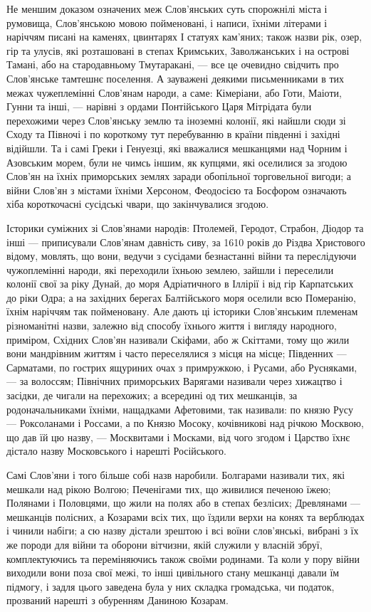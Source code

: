 Не меншим доказом означених меж Слов'янських суть спорожнілі міста і румовища,
Слов'янською мовою пойменовані, і написи, їхніми літерами і наріччям писані на
каменях, цвинтарях І статуях кам'яних; також назви рік, озер, гір та улусів,
які розташовані в степах Кримських, Заволжанських і на острові Тамані, або на
стародавньому Тмутаракані, — все це очевидно свідчить про Слов'янське тамтешнє
поселення. А зауважені деякими письменниками в тих межах чужеплемінні Слов'янам
народи, а саме: Кімеріани, або Готи, Маіоти, Гунни та інші, — нарівні з ордами
Понтійського Царя Мітрідата були перехожими через Слов'янську землю та іноземні
колонії, які найшли сюди зі Сходу та Півночі і по короткому тут перебуванню в
країни південні і західні відійшли. Та і самі Греки і Генуезці, які вважалися
мешканцями над Чорним і Азовським морем, були не чимсь іншим, як купцями, які
оселилися за згодою Слов'ян на їхніх приморських землях заради обопільної
торговельної вигоди; а війни Слов'ян з містами їхніми Херсоном, Феодосією та
Босфором означають хіба короткочасні сусідські чвари, що закінчувалися згодою.

Історики суміжних зі Слов'янами народів: Птолемей, Геродот, Страбон, Діодор та
інші — приписували Слов'янам давність сиву, за 1610 років до Різдва Христового
відому, мовлять, що вони, ведучи з сусідами безнастанні війни та переслідуючи
чужоплемінні народи, які переходили їхньою землею, зайшли і переселили колонії
свої за ріку Дунай, до моря Адріатичного в Іллірії і від гір Карпатських до
ріки Одра; а на західних берегах Балтійського моря оселили всю Померанію, їхнім
наріччям так пойменовану. Але дають ці історики Слов'янським племенам
різноманітні назви, залежно від способу їхнього життя і вигляду народного,
приміром, Східних Слов'ян називали Скіфами, або ж Скіттами, тому що жили вони
мандрівним життям і часто переселялися з місця на місце; Південних — Сарматами,
по гострих ящуриних очах з примружкою, і Русами, або Русняками, — за волоссям;
Північних приморських Варягами називали через хижацтво і засідки, де чигали на
перехожих; а всередині од тих мешканців, за родоначальниками їхніми, нащадками
Афетовими, так називали: по князю Русу — Роксоланами і Россами, а по Князю
Мосоку, кочівникові над річкою Москвою, що дав їй цю назву, — Москвитами і
Москами, від чого згодом і Царство їхнє дістало назву Московського і нарешті
Російського.

Самі Слов'яни і того більше собі назв наробили. Болгарами називали тих, які
мешкали над рікою Волгою; Печенігами тих, що живилися печеною їжею; Полянами і
Половцями, що жили на полях або в степах безлісих; Древлянами — мешканців
полісних, а Козарами всіх тих, що їздили верхи на конях та верблюдах і чинили
набіги; а сю назву дістали зрештою і всі воїни слов'янські, вибрані з їх же
породи для війни та оборони вітчизни, якій служили у власній збруї,
комплектуючись та переміняючись також своїми родинами. Та коли у пору війни
виходили вони поза свої межі, то інші цивільного стану мешканці давали їм
підмогу, і задля цього заведена була у них складка громадська, чи податок,
прозваний нарешті з обуренням Даниною Козарам.

